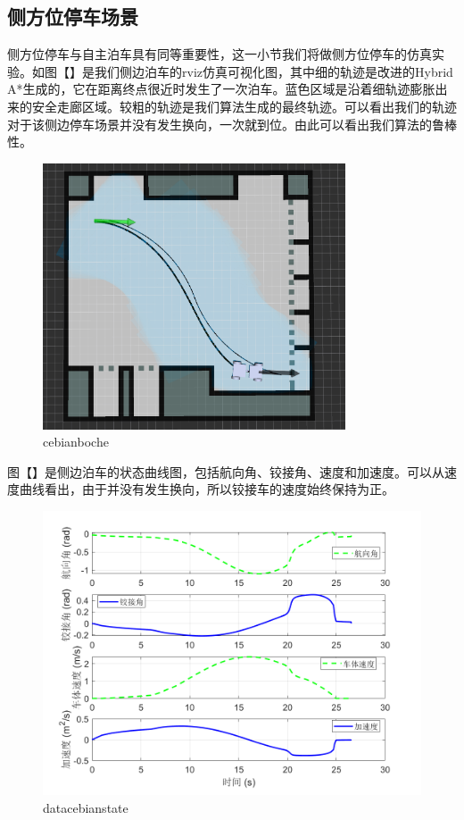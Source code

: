 \documentclass[master,academic]{ysuthesis} %
\begin{document}
		\subsection{侧方位停车场景}
		侧方位停车与自主泊车具有同等重要性，这一小节我们将做侧方位停车的仿真实验。如图【】是我们侧边泊车的rviz仿真可视化图，其中细的轨迹是改进的Hybrid A*生成的，它在距离终点很近时发生了一次泊车。蓝色区域是沿着细轨迹膨胀出来的安全走廊区域。较粗的轨迹是我们算法生成的最终轨迹。可以看出我们的轨迹对于该侧边停车场景并没有发生换向，一次就到位。由此可以看出我们算法的鲁棒性。
		\begin{figure}[!ht]
			\centering
			\includegraphics[width=0.8\textwidth]{cebianboche.png}
			\caption{cebianboche}
			\label{fig:cebianboche}
		\end{figure}

		图【】是侧边泊车的状态曲线图，包括航向角、铰接角、速度和加速度。可以从速度曲线看出，由于并没有发生换向，所以铰接车的速度始终保持为正。
		\begin{figure}[!ht]
			\centering
			\includegraphics[width=1\textwidth]{datacebianstate.png}
			\caption{datacebianstate}
			\label{fig:datacebianstate}
		\end{figure}
\end{document}
